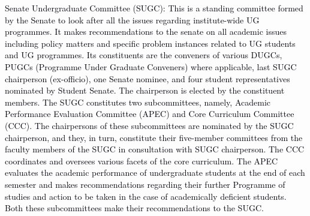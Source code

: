\documentclass[12pt]{article}
\begin{document}
\vspace{\baselineskip}
\begin{justify}
{\fontsize{9pt}{10.8pt}\selectfont \textcolor[HTML]{00000A}{Senate Undergraduate Committee (SUGC): This is a standing committee formed by the Senate to look after all the issues regarding institute-wide UG programmes. It makes recommendations to the senate on all academic issues including policy matters and specific problem instances related to UG students and UG programmes. Its constituents are the conveners of various DUGCs, PUGCs (Programme Under Graduate Conveners) where applicable, last SUGC chairperson (ex-officio), one Senate nominee, and four student representatives nominated by Student Senate. The chairperson is elected by the constituent members. The SUGC constitutes two subcommittees, namely, Academic Performance Evaluation Committee (APEC) and Core Curriculum Committee (CCC). The chairpersons of these subcommittees are nominated by the SUGC chairperson, and they, in turn, constitute their five-member committees from the faculty members of the SUGC in consultation with SUGC chairperson. The CCC coordinates and oversees various facets of the core curriculum. The APEC evaluates the academic performance of undergraduate students at the end of each semester and makes recommendations regarding their further Programme of studies and action to be taken in the case of academically deficient students. Both these subcommittees make their recommendations to the SUGC.}\par}
\end{justify}\par


\vspace{\baselineskip}

\vspace{\baselineskip}

\vspace{\baselineskip}

\vspace{\baselineskip}

\vspace{\baselineskip}

\vspace{\baselineskip}

\vspace{\baselineskip}

\vspace{\baselineskip}

\vspace{\baselineskip}
\end{document}
